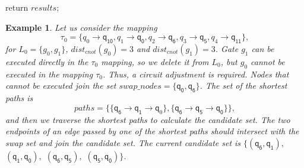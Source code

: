 \documentclass[journal]{IEEEtran}
\newtheorem{example}{Example}
\begin{document}
\begin{algorithm} [htbp]
          return $results$;
          
	\label{algorithm_neighborhood}
	\end{algorithm}

\begin{example}
	Let us consider the mapping $$\tau_{0}=\{\textit{q}_\textit{0}\rightarrow  \textsf{q}_{\textsf{10}},\textit{q}_\textit{1}\rightarrow \textsf{q}_{\textsf{0}},
\textit{q}_\textit{2}\rightarrow  \textsf{q}_{\textsf{6}},\textit{q}_\textit{3}\rightarrow  \textsf{q}_{\textsf{5}},\textit{q}_\textit{4}\rightarrow  \textsf{q}_{\textsf{11}}\} , $$ 
for $L_{0}=\{g_{0},g_{1}\}$, $dist_{cnot}(g_{0})=3$ and $dist_{cnot}(g_{1})=3$. 
Gate $g_{1}$ can be executed directly in the $\tau_{0}$ mapping, so we delete it from $L_{0}$,
but $g_{0}$ cannot be executed in the mapping $\tau_{0}$.
Thus, a circuit adjustment is required. 
Nodes that cannot be executed join the set $swap\_nodes=\{\textsf{q}_{\textsf{0}},\textsf{q}_\textsf{6}\}$.
The set of the shortest paths is $$paths=\{\{\textsf{q}_{\textsf{6}}\rightarrow \textsf{q}_{\textsf{1}} \rightarrow \textsf{q}_{0} \},\{\textsf{q}_\textsf{6}\rightarrow \textsf{q}_\textsf{5} \rightarrow \textsf{q}_\textsf{0} \}\},$$ 
and then we traverse the shortest paths to calculate the  candidate set.
The two endpoints of an edge passed by one of the shortest paths should intersect with the swap set and join the candidate set.
The current candidate set is $\{(\textsf{q}_\textsf{6},\textsf{q}_\textsf{1}),$ $(\textsf{q}_\textsf{1},\textsf{q}_\textsf{0}),$ $(\textsf{q}_\textsf{6},\textsf{q}_\textsf{5}),$ $(\textsf{q}_\textsf{5},\textsf{q}_\textsf{0}) \}$.
\end{example}
\end{document}
